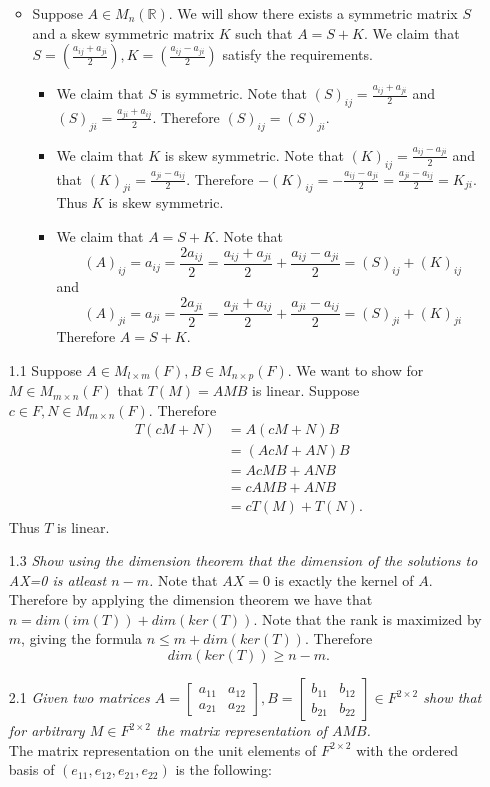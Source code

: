 \documentclass[12pt, letterpaper]{article}
\newcommand{\R}{\mathbb{R}}
\begin{document}
\begin{enumerate}
\begin{itemize}
		\item Suppose $A \in M_n(\R)$.  We will show there exists a symmetric matrix $S$ and a skew symmetric matrix $K$ such that $A = S + K$.  We claim that 
		$S = (\frac{a_{ij} + a_{ji}}{2}), K = (\frac{a_{ij} - a_{ji}}{2})$ satisfy the requirements.
		\begin{itemize}
			\item We claim that $S$ is symmetric.  Note that $(S)_{ij} = \frac{a_{ij} + a_{ji}}{2}$ and $(S)_{ji} = \frac{a_{ji} + a_{ij}}{2}$.
			Therefore $(S)_{ij} = (S)_{ji}$.  
			\item We claim that $K$ is skew symmetric.  Note that $(K)_{ij} = \frac{a_{ij} - a_{ji}}{2}$ and that $(K)_{ji} = \frac{a_{ji} - a_{ij}}{2}$.
			Therefore $-(K)_{ij} = -\frac{a_{ij} - a_{ji}}{2} = \frac{a_{ji} - a_{ij}}{2} = K_{ji}$.  Thus $K$ is skew symmetric.  
			\item We claim that $A = S + K$.  Note that 
			$$
			(A)_{ij}  = a_{ij} = \frac{2a_{ij}}{2} = \frac{a_{ij} + a_{ji}}{2} + \frac{a_{ij} - a_{ji}}{2} = (S)_{ij} + (K)_{ij}
			$$ 
			and
			$$
			(A)_{ji} = a_{ji} = \frac{2a_{ji}}{2} = \frac{a_{ji} + a_{ij}}{2} +
			\frac{a_{ji} - a_{ij}}{2} = (S)_{ji} + (K)_{ji}
			$$
			Therefore $A = S + K$.  
		\end{itemize}
	\end{itemize}
	\item[1.1] Suppose $A \in M_{l \times m}(F), B \in M_{n\times p}(F)$.
	We want to show for $M \in M_{m \times n} (F)$ that $T(M) = AMB$ is linear.
	Suppose $c \in F, N \in M_{m \times n} (F)$.  Therefore 
	\begin{align*}
		T(cM + N) &= A(cM + N)B\\
		&= (AcM + AN)B\\
		&= AcMB + ANB\\
		&= cAMB + ANB\\
		&= cT(M) + T(N).
	\end{align*}
	Thus $T$ is linear.  
	\item[1.3] \textit{Show using the dimension theorem that the dimension of the solutions to AX=0 is atleast $n-m$.}
	Note that $AX = 0$ is exactly the kernel of $A$.  
	Therefore by applying the dimension theorem we have that $n = dim(im(T)) + dim(ker(T))$.  Note that the rank is maximized by $m$, giving the formula
	$n \leq m + dim(ker(T))$.  Therefore
	$$
	dim(ker(T)) \geq n - m.  
	$$ 
	\item[2.1] \textit{Given two matrices $A = \begin{bmatrix} a_{11} & a_{12}\\	 a_{21}& a_{22}\end{bmatrix}, B = \begin{bmatrix} b_{11} & b_{12}\\	 b_{21}& b_{22}\end{bmatrix} \in F^{2 \times 2}$ show that for arbitrary $M \in F^{2 \times 2}$ the matrix representation of $AMB$.   }\\
	The matrix representation on the unit elements of $F^{2 \times 2}$ 
	with the ordered basis of $(e_{11},e_{12},e_{21},e_{22})$ is the following:\\
	

\end{enumerate}
\end{document}
